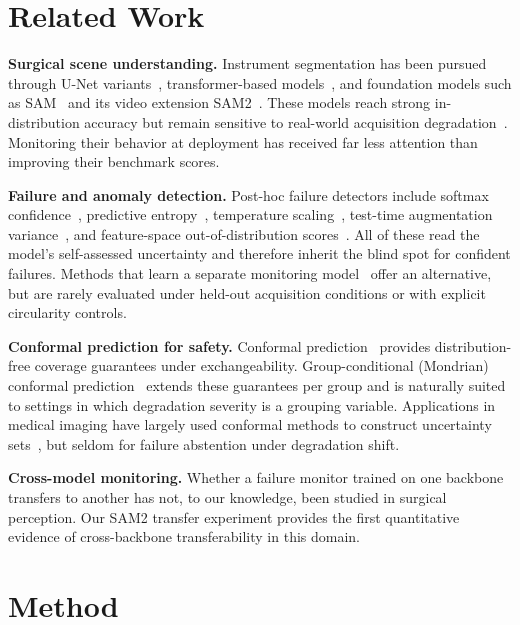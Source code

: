 \documentclass[letterpaper, 10 pt, conference]{ieeeconf}  %
\newcommand{\unet}{U-Net}
\begin{document}
\section{Related Work}

\textbf{Surgical scene understanding.} Instrument segmentation has been
pursued through \unet{} variants~\cite{ref:ronneberger}, transformer-based
models~\cite{ref:dong}, and foundation models such as
SAM~\cite{ref:kirillov} and its video extension SAM2~\cite{ref:ravi}. These
models reach strong in-distribution accuracy but remain sensitive to
real-world acquisition degradation~\cite{ref:michieli}. Monitoring their
behavior at deployment has received far less attention than improving their
benchmark scores.

\textbf{Failure and anomaly detection.} Post-hoc failure detectors include
softmax confidence~\cite{ref:hendrycks}, predictive
entropy~\cite{ref:malinin}, temperature scaling~\cite{ref:guo}, test-time
augmentation variance~\cite{ref:lakshmi}, and feature-space
out-of-distribution scores~\cite{ref:lee}. All of these read the model's
self-assessed uncertainty and therefore inherit the blind spot for confident
failures. Methods that learn a separate monitoring
model~\cite{ref:granese, ref:corbiere} offer an alternative, but are rarely
evaluated under held-out acquisition conditions or with explicit circularity
controls.

\textbf{Conformal prediction for safety.} Conformal
prediction~\cite{ref:vovk, ref:angelo_intro} provides distribution-free
coverage guarantees under exchangeability. Group-conditional (Mondrian)
conformal prediction~\cite{ref:mondrian} extends these guarantees per group
and is naturally suited to settings in which degradation severity is a
grouping variable. Applications in medical imaging have largely used
conformal methods to construct uncertainty
sets~\cite{ref:lu, ref:angelo_img}, but seldom for failure abstention under
degradation shift.

\textbf{Cross-model monitoring.} Whether a failure monitor trained on one
backbone transfers to another has not, to our knowledge, been studied in
surgical perception. Our SAM2 transfer experiment provides the first
quantitative evidence of cross-backbone transferability in this domain.

\section{Method}
\end{document}
